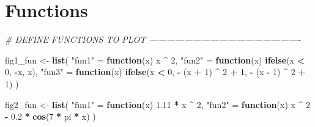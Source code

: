 \documentclass[11pt,]{article}
\newenvironment{Shaded}{\begin{snugshade}}{\end{snugshade}}
\newcommand{\CommentTok}[1]{\textcolor[rgb]{0.56,0.35,0.01}{\textit{#1}}}
\newcommand{\ControlFlowTok}[1]{\textcolor[rgb]{0.13,0.29,0.53}{\textbf{#1}}}
\newcommand{\DecValTok}[1]{\textcolor[rgb]{0.00,0.00,0.81}{#1}}
\newcommand{\FloatTok}[1]{\textcolor[rgb]{0.00,0.00,0.81}{#1}}
\newcommand{\KeywordTok}[1]{\textcolor[rgb]{0.13,0.29,0.53}{\textbf{#1}}}
\newcommand{\NormalTok}[1]{#1}
\newcommand{\OperatorTok}[1]{\textcolor[rgb]{0.81,0.36,0.00}{\textbf{#1}}}
\newcommand{\StringTok}[1]{\textcolor[rgb]{0.31,0.60,0.02}{#1}}
\begin{document}
\newpage

\hypertarget{functions}{%
\section{Functions}\label{functions}}

\begin{Shaded}
\begin{Highlighting}[]
\CommentTok{# DEFINE FUNCTIONS TO PLOT ----------------------------------------------------}

\NormalTok{fig1_fun <-}\StringTok{ }\KeywordTok{list}\NormalTok{(}
  \StringTok{"fun1"}\NormalTok{ =}\StringTok{ }\ControlFlowTok{function}\NormalTok{(x) x }\OperatorTok{^}\StringTok{ }\DecValTok{2}\NormalTok{,}
  \StringTok{"fun2"}\NormalTok{ =}\StringTok{ }\ControlFlowTok{function}\NormalTok{(x) }\KeywordTok{ifelse}\NormalTok{(x }\OperatorTok{<}\StringTok{ }\DecValTok{0}\NormalTok{, }\OperatorTok{-}\NormalTok{x, x),}
  \StringTok{"fun3"}\NormalTok{ =}\StringTok{ }\ControlFlowTok{function}\NormalTok{(x) }\KeywordTok{ifelse}\NormalTok{(x }\OperatorTok{<}\StringTok{ }\DecValTok{0}\NormalTok{, }\OperatorTok{-}\StringTok{ }\NormalTok{(x }\OperatorTok{+}\StringTok{ }\DecValTok{1}\NormalTok{) }\OperatorTok{^}\StringTok{ }\DecValTok{2} \OperatorTok{+}\StringTok{ }\DecValTok{1}\NormalTok{, }\OperatorTok{-}\StringTok{ }\NormalTok{(x }\OperatorTok{-}\StringTok{ }\DecValTok{1}\NormalTok{) }\OperatorTok{^}\StringTok{ }\DecValTok{2} \OperatorTok{+}\StringTok{ }\DecValTok{1}\NormalTok{)}
\NormalTok{)}

\NormalTok{fig2_fun <-}\StringTok{ }\KeywordTok{list}\NormalTok{(}
  \StringTok{"fun1"}\NormalTok{ =}\StringTok{ }\ControlFlowTok{function}\NormalTok{(x) }\FloatTok{1.11} \OperatorTok{*}\StringTok{ }\NormalTok{x }\OperatorTok{^}\StringTok{ }\DecValTok{2}\NormalTok{,}
  \StringTok{"fun2"}\NormalTok{ =}\StringTok{ }\ControlFlowTok{function}\NormalTok{(x) x }\OperatorTok{^}\StringTok{ }\DecValTok{2} \OperatorTok{-}\StringTok{ }\FloatTok{0.2} \OperatorTok{*}\StringTok{ }\KeywordTok{cos}\NormalTok{(}\DecValTok{7} \OperatorTok{*}\StringTok{ }\NormalTok{pi }\OperatorTok{*}\StringTok{ }\NormalTok{x)}
\NormalTok{)}


\end{Highlighting}
\end{Shaded}
\end{document}
